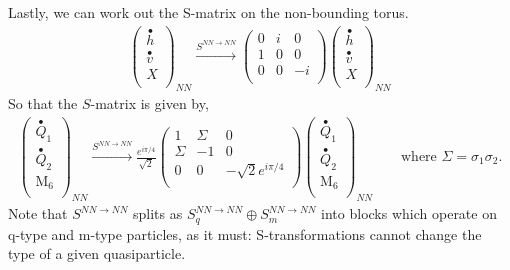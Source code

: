 \documentclass[12pt,a4paper]{article}
\newcounter{arrow}
\newcommand{\ra}{\rightarrow}
\begin{document}
Lastly, we can work out the S-matrix on the non-bounding torus.
\begin{align}
\left( \begin{matrix}
\stackrel{\bullet}{h} \\
\stackrel{\bullet}{v} \\
X \\
\end{matrix} \right)_{NN}
\xrightarrow{S^{NN\rightarrow NN}} 
\left( \begin{matrix}
0&i  &0 \\ 
1&0 &0 \\
0&0& -i \\
\end{matrix} \right)
\left( \begin{matrix}
\stackrel{\bullet}{h} \\
\stackrel{\bullet}{v} \\
X \\\end{matrix} \right)_{NN}
\end{align}
So that the $S$-matrix is given by,
\begin{align}
\left( \begin{matrix}
\stackrel{\bullet}{Q}_{1}\\
\stackrel{\bullet}{Q}_{2}\\
\text{M}_6 \\ 
\end{matrix} \right)_{NN}
 \xrightarrow{S^{NN \rightarrow NN}}
\frac{e^{i \pi /4}}{\sqrt{2}}\left( \begin{matrix} 
1&\Sigma &0 \\
\Sigma &-1&0\\
0&0& -\sqrt{2} e^{i \pi /4}\\
\end{matrix} \right)
\left( \begin{matrix}
\stackrel{\bullet}{Q}_{1}\\
\stackrel{\bullet}{Q}_{2}\\
\text{M}_6 \\ 
\end{matrix} \right)_{NN}
\quad \quad \text{where $\Sigma = \sigma_1 \sigma_2$.}
\end{align}
Note that $S^{NN\ra NN}$ splits as $S^{NN\ra NN}_q \oplus S^{NN\ra NN}_m$ into blocks which operate on q-type and m-type particles, as it must: S-transformations cannot change the type of a given quasiparticle. 
\end{document}
